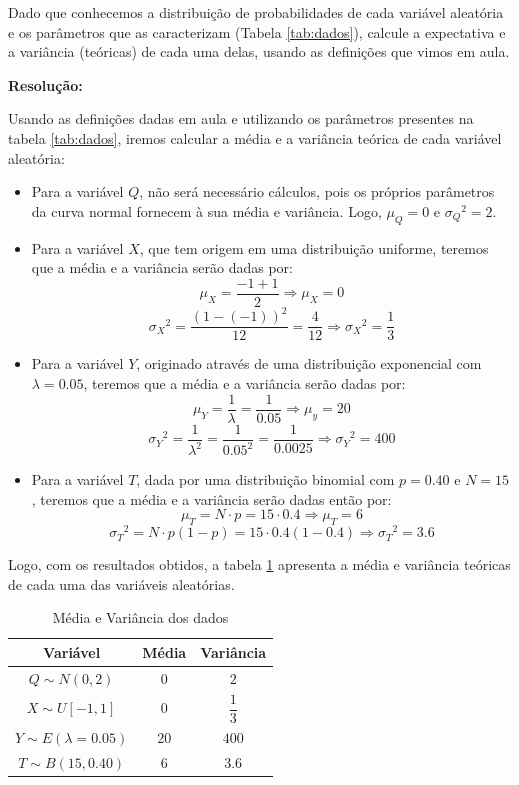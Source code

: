 \documentclass[a4paper, 11pt]{article}
\begin{document}
\noindent Dado que conhecemos a distribuição de probabilidades de cada variável aleatória e os parâmetros que as caracterizam (Tabela \ref{tab:dados}), calcule a expectativa e a variância (teóricas) de cada uma delas, usando as definições que vimos em aula.

\textbf{Resolução:}

Usando as definições dadas em aula \cite{borges_site} e utilizando os parâmetros presentes na tabela \ref{tab:dados}, iremos calcular a média e a variância teórica de cada variável aleatória:

\begin{itemize}
    \item Para a variável $Q$, não será necessário cálculos, pois os próprios parâmetros da curva normal fornecem à sua média e variância. Logo, $\mu_Q = 0$ e ${{\sigma}_Q}^{2} = 2$.
    
    \item Para a variável $X$, que tem origem em uma distribuição uniforme, teremos que a média e a variância serão dadas por:
    \[
    \mu_X = \dfrac{-1+1}{2} \Rightarrow \mu_X = 0
    \]
    \[
    {{\sigma}_X}^{2} = \dfrac{{(1-(-1))}^2}{12}=\dfrac{4}{12} \Rightarrow {{\sigma}_X}^{2} = \dfrac{1}{3}
    \]

    \item Para a variável $Y$, originado através de uma distribuição exponencial com $\lambda=0.05$, teremos que a média e a variância serão dadas por:
    \[
    \mu_Y = \dfrac{1}{\lambda} = \dfrac{1}{0.05} \Rightarrow \mu_y = 20
    \]
    \[
    {{\sigma}_Y}^{2} = \dfrac{1}{\lambda^2} = \dfrac{1}{0.05^2} = \dfrac{1}{0.0025} \Rightarrow {{\sigma}_Y}^{2} = 400
    \]

    \item Para a variável $T$, dada por uma distribuição binomial com $p=0.40$ e $N=15$, teremos que a média e a variância serão dadas então por:
    \[
    \mu_T = N \cdot p = 15 \cdot 0.4 \Rightarrow \mu_T = 6
    \]
    \[
    {{\sigma}_T}^{2} = N\cdot p(1-p)=15 \cdot 0.4(1-0.4) \Rightarrow {{\sigma}_T}^{2} = 3.6
    \]
\end{itemize}

Logo, com os resultados obtidos, a tabela \ref{tab:medvar} apresenta a média e variância teóricas de cada uma das variáveis aleatórias.

\begin{table}[H]
    \centering
    \begin{tabular}{|c|c|c|}
        \hline
        \textbf{Variável} & \textbf{Média} & \textbf{Variância} \\
        \hline
        $Q \sim N(0, 2)$ & $0$ & $2$ \\
        $X \sim U[-1, 1]$ & $0$ & $\dfrac{1}{3}$ \\
        $Y \sim E(\lambda = 0.05)$ & $20$ & $400$ \\
        $T \sim B(15, 0.40)$ & $6$ & $3.6$ \\
        \hline
    \end{tabular}
    \caption{Média e Variância dos dados}
    \label{tab:medvar}
\end{table}
\end{document}
